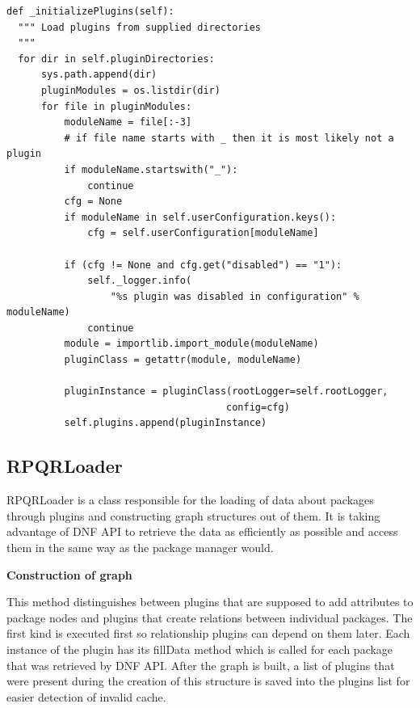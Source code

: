 \begin{lstlisting}
def _initializePlugins(self):
  """ Load plugins from supplied directories
  """
  for dir in self.pluginDirectories:
      sys.path.append(dir)
      pluginModules = os.listdir(dir)
      for file in pluginModules:
          moduleName = file[:-3]
          # if file name starts with _ then it is most likely not a plugin
          if moduleName.startswith("_"):
              continue
          cfg = None
          if moduleName in self.userConfiguration.keys():
              cfg = self.userConfiguration[moduleName]

          if (cfg != None and cfg.get("disabled") == "1"):
              self._logger.info(
                  "%s plugin was disabled in configuration" % moduleName)
              continue
          module = importlib.import_module(moduleName)
          pluginClass = getattr(module, moduleName)

          pluginInstance = pluginClass(rootLogger=self.rootLogger,
                                      config=cfg)
          self.plugins.append(pluginInstance)
\end{lstlisting}

\newpage

\subsection*{RPQRLoader}
RPQRLoader is a class responsible for the loading of data about packages through plugins and constructing
graph structures out of them. It is taking advantage of DNF API to retrieve the data as efficiently as
possible and access them in the same way as the package manager would.

\textbf{Construction of graph}

This method distinguishes between plugins that are supposed to add attributes to package nodes and
plugins that create relations between individual packages. The first kind is executed first so
relationship plugins can depend on them later. Each instance of the plugin has its fillData method
which is called for each package that was retrieved by DNF API. After the graph is built, a list
of plugins that were present during the creation of this structure is saved into the plugins list for easier
detection of invalid cache.

